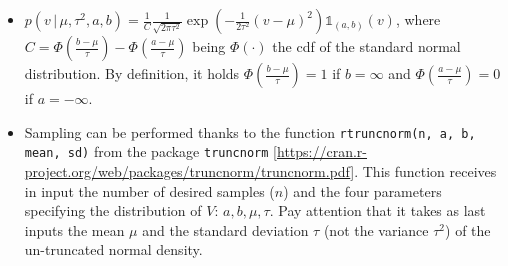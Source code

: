 \documentclass[
  11pt,
]{article}
\providecommand{\tightlist}{%
  \setlength{\itemsep}{0pt}\setlength{\parskip}{0pt}}
\begin{document}
\begin{itemize}
\tightlist
\item
  \(p(v \,|\,\mu, \tau^2, a, b) = \frac{1}{C} \frac{1}{\sqrt{2\pi\tau^2}} \operatorname{exp}\left(-\frac{1}{2\tau^2}(v - \mu)^2\right) \mathds{1}_{(a, b)}(v)\),
  where
  \(C = \Phi\left(\frac{b - \mu}{\tau}\right) - \Phi\left(\frac{a - \mu}{\tau}\right)\)
  being \(\Phi(\cdot)\) the cdf of the standard normal distribution. By
  definition, it holds \(\Phi\left(\frac{b - \mu}{\tau}\right) = 1\) if
  \(b = \infty\) and \(\Phi\left(\frac{a - \mu}{\tau}\right) = 0\) if
  \(a = -\infty\).
\item
  Sampling can be performed thanks to the function
  \texttt{rtruncnorm(n, a, b, mean, sd)} from the package
  \texttt{truncnorm}
  {[}\url{https://cran.r-project.org/web/packages/truncnorm/truncnorm.pdf}{]}.
  This function receives in input the number of desired samples (\(n\))
  and the four parameters specifying the distribution of \(V\):
  \(a, b, \mu, \tau\). Pay attention that it takes as last inputs the
  mean \(\mu\) and the standard deviation \(\tau\) (not the variance
  \(\tau^2\)) of the un-truncated normal density.
\end{itemize}

\medskip
\end{document}
